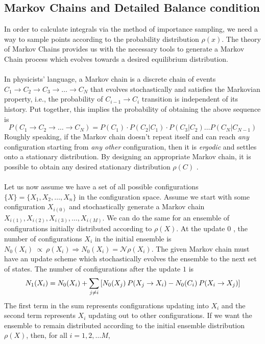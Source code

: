 \documentclass[../journal_main.tex]{subfiles}
\begin{document}
\subsection{Markov Chains and Detailed Balance condition}
In order to calculate integrals via the method of importance sampling, we need a way to sample points according to the probability distribution $\rho(x)$. The theory of Markov Chains provides us with the necessary tools to generate a Markov Chain process which evolves towards a desired equilibrium distribution.~\\~\\
In physicists' language, a Markov chain is a discrete chain of events $C_1 \to C_2 \to C_3 \to \ldots \to C_N$ that evolves stochastically and satisfies the Markovian property, i.e., the probability of $C_{i-1} \to C_i$ transition is independent of its history. Put together, this implies the probability of obtaining the above sequence is
\begin{equation}
    P(C_1 \to C_2 \to\ldots \to C_N) = P(C_1)\cdot P(C_2 | C_1) \cdot P(C_3 | C_2) \ldots P(C_N | C_{N-1})
\end{equation}
Roughly speaking, if the Markov chain doesn't repeat itself and can reach \textit{any}  configuration starting from \textit{any other}  configuration, then it is \textit{ergodic} and settles onto a stationary distribution. By designing an appropriate Markov chain, it is possible to obtain any desired stationary distribution $\rho(C)$ .~\\~\\
Let us now assume we have a set of all possible configurations $\{X\} = \{X_1, X_2, \ldots, X_n\}$ in the configuration space. Assume we start with some configuration $X_{i(0)}$ and stochastically generate a Markov chain $X_{i(1)}, X_{i(2)}, X_{i(3)}, \ldots, X_{i(M)}$. We can do the same for an ensemble of configurations initially distributed according to $\rho(X)$. At the update $0$ , the number of configurations $X_i$ in the initial ensemble is $N_0(X_i) \: \propto \: \rho(X_i) \Rightarrow N_0 (X_i) = \mathcal{N} \rho(X_i)$. The given Markov chain must have an update scheme which stochastically evolves the ensemble to the next set of states. The number of configurations after the update $1$ is
\begin{equation}
    N_1(X_i) = N_0(X_i) + \sum_{j\neq i} \qty[N_0(X_j) \: P(X_j \to X_i) - N_0(C_i) \: P(X_i \to X_j)]
    \label{master}
\end{equation}
The first term in the sum represents configurations updating into $X_i$ and the second term represents $X_i$ updating out to other configurations. If we want the ensemble to remain distributed according to the initial ensemble distribution $\rho(X)$, then, for all $i = 1, 2, \ldots M$,
\end{document}
